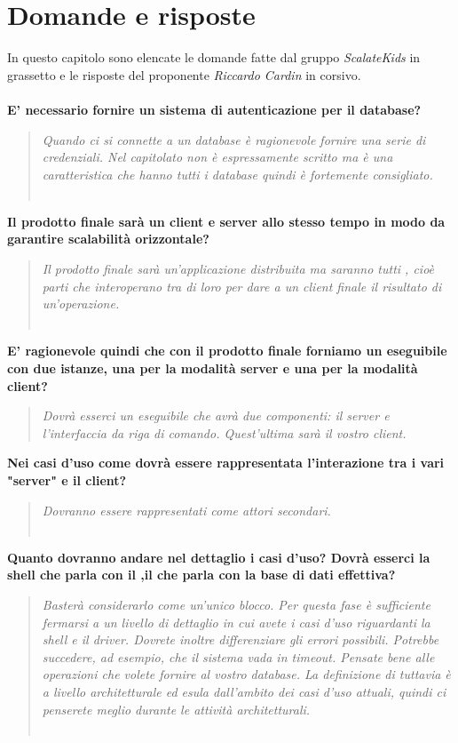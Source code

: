 \documentclass{scalatekids-article}
\begin{document}
\section{Domande e risposte}
In questo capitolo sono elencate le domande fatte dal gruppo \textit{ScalateKids} in grassetto e le risposte del proponente \textit{Riccardo Cardin} in corsivo.
\textbf{\\ \\E' necessario fornire un sistema di autenticazione per il database?}
\begin{quote}
  \textit{Quando ci si connette a un database è ragionevole fornire una serie di credenziali. Nel capitolato non è espressamente scritto ma è una caratteristica che hanno tutti i database quindi è fortemente consigliato.\\ \\}
\end{quote}
\textbf{Il prodotto finale sarà un client e server allo stesso tempo in modo da garantire scalabilità orizzontale?}
\begin{quote}
  \textit{Il prodotto finale sarà un'applicazione distribuita ma saranno tutti , cioè parti che interoperano tra di loro per dare a un client finale il risultato di un'operazione.\\ \\}
\end{quote}
\textbf{E' ragionevole quindi che con il prodotto finale forniamo un eseguibile con due istanze, una per la modalità server e una per la modalità client?}
\begin{quote}
  \textit{Dovrà esserci un eseguibile che avrà due componenti: il server e l'interfaccia da riga di comando. Quest'ultima sarà il vostro client.}
\end{quote}
\textbf{Nei casi d'uso come dovrà essere rappresentata l'interazione tra i vari "server" e il client?}
\begin{quote}
  \textit{Dovranno essere rappresentati come attori secondari.\\ \\}
\end{quote}
\textbf{Quanto dovranno andare nel dettaglio i casi d'uso? Dovrà esserci la shell che parla con il ,il  che parla con la base di dati effettiva?}
\begin{quote}
  \textit{Basterà considerarlo come un'unico blocco. Per questa fase è sufficiente fermarsi a un livello di dettaglio in cui avete i casi d'uso riguardanti la shell e il driver. Dovrete inoltre differenziare gli errori possibili. Potrebbe succedere, ad esempio, che il sistema vada in timeout. Pensate bene alle operazioni che volete fornire al vostro database. La definizione di  tuttavia è a livello architetturale ed esula dall'ambito dei casi d'uso attuali, quindi ci penserete meglio durante le attività architetturali.\\ \\}
\end{quote}
\end{document}
